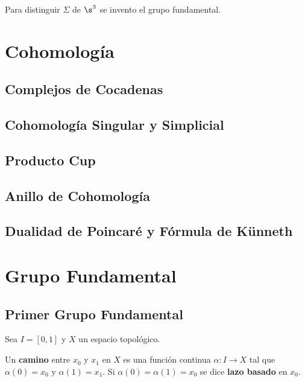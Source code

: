 \documentclass{article}
\begin{document}
\vspace{2mm}
\noindent Para distinguir $\Sigma$ de $\s^{3}$ se invento el grupo fundamental.

\newpage
\section{Cohomología}

\subsection{Complejos de Cocadenas}

\newpage
\subsection{Cohomología Singular y Simplicial}

\newpage
\subsection{Producto Cup}

\newpage
\subsection{Anillo de Cohomología}

\newpage
\subsection{Dualidad de Poincaré y Fórmula de Künneth}

\newpage
\section{Grupo Fundamental}

\subsection{Primer Grupo Fundamental}
\noindent Sea $I=[0,1]$ y $X$ un espacio topológico.

\vspace{2mm}
\begin{dfn}
    Un \textbf{camino} entre $x_{0}$ y $x_{1}$ en $X$ es una función continua $\alpha:I\to X$ tal 
    que $\alpha(0)=x_{0}$ y $\alpha(1)=x_{1}$. Si $\alpha(0)=\alpha(1)=x_{0}$ se dice 
    \textbf{lazo basado} en $x_{0}$.
\end{dfn}
\end{document}
